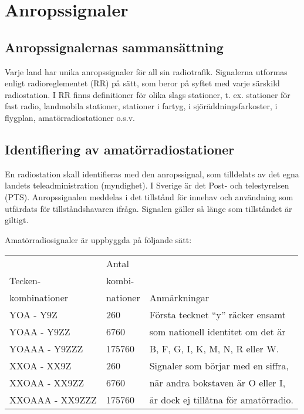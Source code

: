 \section{Anropssignaler}

\subsection{Anropssignalernas sammansättning}

Varje land har unika anropssignaler för all sin
radiotrafik. Signalerna utformas enligt radioreglementet (RR) på sätt,
som beror på syftet med varje särskild radiostation. I RR finns
definitioner för olika slags stationer, t. ex. stationer för fast
radio, landmobila stationer, stationer i fartyg, i
sjöräddningsfarkoster, i flygplan, amatörradiostationer o.s.v.

\subsection{Identifiering av amatörradiostationer}

En radiostation skall identifieras med den anropssignal, som
tilldelats av det egna landets teleadministration (myndighet). I Sverige
är det Post- och telestyrelsen (PTS).  Anropssignalen meddelas i det
tillstånd för innehav och användning som utfärdats för
tillståndshavaren ifråga. Signalen gäller så länge som tillståndet är
giltigt.

Amatörradiosignaler är uppbyggda på följande sätt:

\begin{tabular}{l|l|l}
                & Antal    &  \\
  Tecken-       & kombi-   &  \\
  kombinationer & nationer & Anmärkningar \\
  \hline
  YOA - Y9Z &
  260 &
  Första tecknet ``y'' räcker ensamt
  \\
  YOAA - Y9ZZ &
  6760 &
  som nationell identitet om det är
  \\
  YOAAA - Y9ZZZ &
  175760 &
  B, F, G, I, K, M, N, R eller W.
  \\
  \hline
  XXOA - XX9Z &
  260 &
  Signaler som börjar med en siffra,
  \\
  XXOAA - XX9ZZ &
  6760 &
  när andra bokstaven är O eller I,
  \\
  XXOAAA - XX9ZZZ &
  175760 &
  är dock ej tillåtna för amatörradio.
  \\
\end{tabular}

